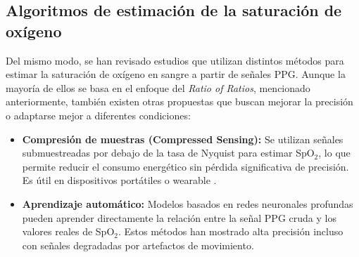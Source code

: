 \subsection{Algoritmos de estimación de la saturación de oxígeno}

Del mismo modo, se han revisado estudios que utilizan distintos métodos para estimar la saturación de oxígeno en sangre a partir de señales PPG. Aunque la mayoría de ellos se basa en el enfoque del \textit{Ratio of Ratios}, mencionado anteriormente, también existen otras propuestas que buscan mejorar la precisión o adaptarse mejor a diferentes condiciones:


\begin{itemize}
  \item \textbf{Compresión de muestras (Compressed Sensing):} Se utilizan señales submuestreadas por debajo de la tasa de Nyquist para estimar SpO$_2$, lo que permite reducir el consumo energético sin pérdida significativa de precisión. Es útil en dispositivos portátiles o wearable \cite{mohan2010blood}.

  \item \textbf{Aprendizaje automático:} Modelos basados en redes neuronales profundas pueden aprender directamente la relación entre la señal PPG cruda y los valores reales de SpO$_2$. Estos métodos han mostrado alta precisión incluso con señales degradadas por artefactos de movimiento\cite{shuzan2023machine}.
\end{itemize}
